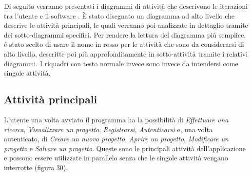 Di seguito verranno presentati i diagrammi di attività che descrivono le iterazioni tra l'utente e il software \PROGETTO.
È stato disegnato un diagramma ad alto livello che descrive le attività principali, le quali verranno poi analizzate in dettaglio tramite dei sotto-diagrammi specifici. Per rendere la lettura del diagramma più semplice, é stato scelto di usare il nome in rosso per le attività che sono da considerarsi di alto livello, descritte poi più approfonditamente in sotto-attività tramite i relativi diagrammi. I riquadri con testo normale invece sono invece da intendersi come singole attività.

\subsection{Attività principali}
L'utente una volta avviato il programma ha la possibilità di \textit{Effettuare una ricerca}, \textit{Visualizzare un progetto}, \textit{Registrarsi}, \textit{Autenticarsi} e, una volta autenticato, di \textit{Creare un nuovo progetto}, \textit{Aprire un progetto}, \textit{Modificare un progetto} e \textit{Salvare un progetto}. Queste sono le principali attività dell'applicazione e possono essere utilizzate in parallelo senza che le singole attività vengano interrotte (figura 30).


